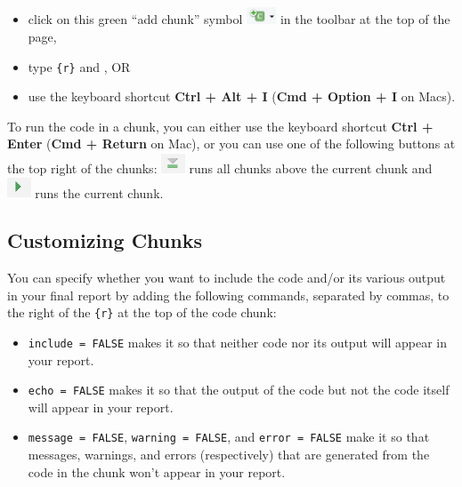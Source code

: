 \documentclass[
  letterpaper,
]{krantz}
\begin{document}
\begin{itemize}
\item
  click on this green ``add chunk'' symbol
  \includegraphics[width=0.34722in,height=\textheight]{book/images/rmarkdown_reports/add-chunk.png}
  in the toolbar at the top of the page,
\item
  type \texttt{\textasciigrave{}\textasciigrave{}\textasciigrave{}\{r\}}
  and \texttt{\textasciigrave{}\textasciigrave{}\textasciigrave{}}, OR
\item
  use the keyboard shortcut \textbf{Ctrl + Alt + I} (\textbf{Cmd +
  Option + I} on Macs).
\end{itemize}

To run the code in a chunk, you can either use the keyboard shortcut
\textbf{Ctrl + Enter} (\textbf{Cmd + Return} on Mac), or you can use one
of the following buttons at the top right of the chunks:
\includegraphics[width=0.27778in,height=\textheight]{book/images/rmarkdown_reports/run-all-chunks-above.png}
runs all chunks above the current chunk and
\includegraphics[width=0.27778in,height=\textheight]{book/images/rmarkdown_reports/run-current-chunk.png}
runs the current chunk.

\subsection{Customizing Chunks}\label{customizing-chunks}

You can specify whether you want to include the code and/or its various
output in your final report by adding the following commands, separated
by commas, to the right of the \texttt{\{r\}} at the top of the code
chunk:

\begin{itemize}
\item
  \texttt{include\ =\ FALSE} makes it so that neither code nor its
  output will appear in your report.
\item
  \texttt{echo\ =\ FALSE} makes it so that the output of the code but
  not the code itself will appear in your report.
\item
  \texttt{message\ =\ FALSE}, \texttt{warning\ =\ FALSE}, and
  \texttt{error\ =\ FALSE} make it so that messages, warnings, and
  errors (respectively) that are generated from the code in the chunk
  won't appear in your report.
\end{itemize}
\end{document}

